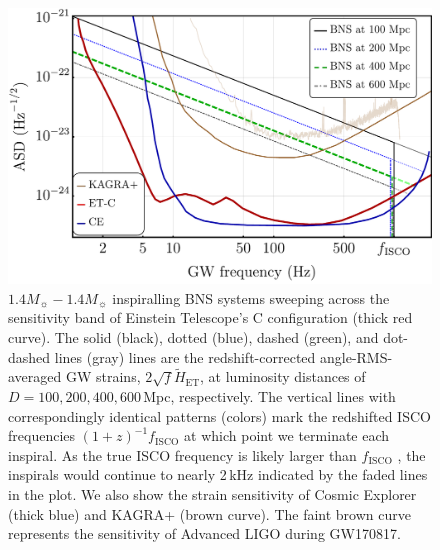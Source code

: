 \documentclass{aa}
\begin{document}
\begin{figure}[t!]
\includegraphics[width=\linewidth]{../Figs/ET_strains_redshifted_v2.pdf}
\caption{%
$1.4 M_\sun-1.4 M_\sun$ inspiralling BNS systems sweeping across the sensitivity band of Einstein Telescope's C configuration (thick red curve).
The solid (black), dotted (blue), dashed (green), and dot-dashed lines (gray) lines are the redshift-corrected
angle-RMS-averaged GW strains, $2\sqrt{f}\tilde{H}_\text{ET}$, at luminosity distances of $D=100, 200, 400, 600\,$Mpc, respectively. 
The vertical lines with correspondingly identical patterns (colors) mark the redshifted ISCO frequencies $(1+z)^{-1} f_\text{ISCO}$ at which point we terminate each inspiral.
As the true ISCO frequency is likely larger than $f_\text{ISCO}$ \citep{Marronetti:2003hx}, the inspirals would continue to nearly 2\,kHz indicated by the faded lines in the plot.
We also show the strain sensitivity of Cosmic Explorer (thick blue) and KAGRA+ (brown curve).
The faint brown curve represents the sensitivity of Advanced LIGO during GW170817.
}
\label{fig:ETB2030}
\end{figure}
%
%
%
\end{document}
